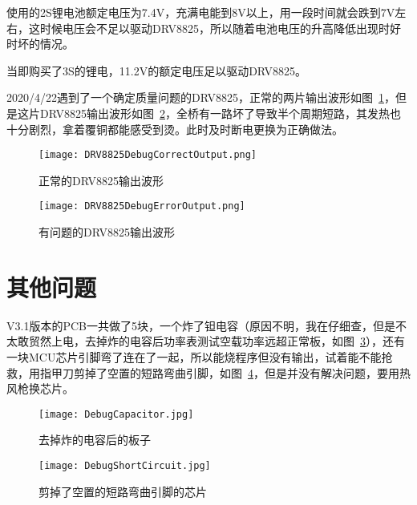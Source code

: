 使用的2S锂电池额定电压为7.4V，充满电能到8V以上，用一段时间就会跌到7V左右，这时候电压会不足以驱动DRV8825，所以随着电池电压的升高降低出现时好时坏的情况。

当即购买了3S的锂电，11.2V的额定电压足以驱动DRV8825。

2020/4/22遇到了一个确定质量问题的DRV8825，正常的两片输出波形如图~\ref{fig:DRV8825DebugCorrectOutput}，但是这片DRV8825输出波形如图~\ref{fig:DRV8825DebugErrorOutput}，全桥有一路坏了导致半个周期短路，其发热也十分剧烈，拿着覆铜都能感受到烫。此时及时断电更换为正确做法。

\begin{figure}[htbp]
    \centering
    \texttt{[image: DRV8825DebugCorrectOutput.png]}
    \caption{正常的DRV8825输出波形}
    \label{fig:DRV8825DebugCorrectOutput}
\end{figure}

\begin{figure}[htbp]
    \centering
    \texttt{[image: DRV8825DebugErrorOutput.png]}
    \caption{有问题的DRV8825输出波形}
    \label{fig:DRV8825DebugErrorOutput}
\end{figure}


\section{其他问题}

V3.1版本的PCB一共做了5块，一个炸了钽电容（原因不明，我在仔细查，但是不太敢贸然上电，去掉炸的电容后功率表测试空载功率远超正常板，如图~\ref{fig:DebugCapacitor}），还有一块MCU芯片引脚弯了连在了一起，所以能烧程序但没有输出，试着能不能抢救，用指甲刀剪掉了空置的短路弯曲引脚，如图~\ref{fig:DebugShortCircuit}，但是并没有解决问题，要用热风枪换芯片。

\begin{figure}[htbp]
    \centering
    \texttt{[image: DebugCapacitor.jpg]}
    \caption{去掉炸的电容后的板子}
    \label{fig:DebugCapacitor}
\end{figure}

\begin{figure}[htbp]
    \centering
    \texttt{[image: DebugShortCircuit.jpg]}
    \caption{剪掉了空置的短路弯曲引脚的芯片}
    \label{fig:DebugShortCircuit}
\end{figure}

